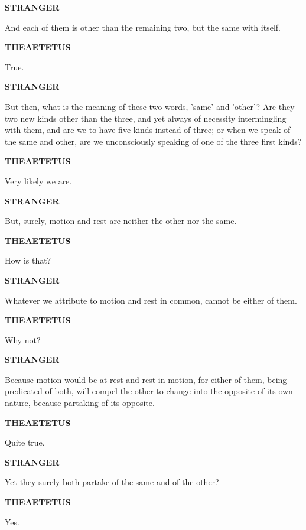 \documentclass[11pt,letter]{article}
\begin{document}
\par \textbf{STRANGER}
\par   And each of them is other than the remaining two, but the same with itself.

\par \textbf{THEAETETUS}
\par   True.

\par \textbf{STRANGER}
\par   But then, what is the meaning of these two words, 'same' and 'other'? Are they two new kinds other than the three, and yet always of necessity intermingling with them, and are we to have five kinds instead of three; or when we speak of the same and other, are we unconsciously speaking of one of the three first kinds?

\par \textbf{THEAETETUS}
\par   Very likely we are.

\par \textbf{STRANGER}
\par   But, surely, motion and rest are neither the other nor the same.

\par \textbf{THEAETETUS}
\par   How is that?

\par \textbf{STRANGER}
\par   Whatever we attribute to motion and rest in common, cannot be either of them.

\par \textbf{THEAETETUS}
\par   Why not?

\par \textbf{STRANGER}
\par   Because motion would be at rest and rest in motion, for either of them, being predicated of both, will compel the other to change into the opposite of its own nature, because partaking of its opposite.

\par \textbf{THEAETETUS}
\par   Quite true.

\par \textbf{STRANGER}
\par   Yet they surely both partake of the same and of the other?

\par \textbf{THEAETETUS}
\par   Yes.
\end{document}
